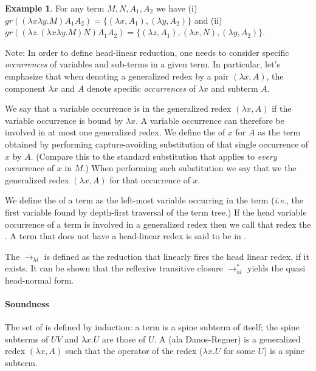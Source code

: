 \documentclass{article}
\makeatletter
\theoremstyle{definition}
\newtheorem{example}{Example}[section]
\renewcommand\ie{{\it i.e.\@\xspace}}
\makeatother
\begin{document}
\begin{example} For any term $M, N, A_1, A_2$ we have
(i) $gr((\lambda x \lambda y . M) A_1 A_2) = \{ (\lambda x, A_1), (\lambda y, A_2)\}$ and
(ii) $gr((\lambda z . (\lambda x \lambda y . M) N) A_1 A_2) = \{ (\lambda z, A_1), (\lambda x, N), (\lambda y, A_2)\}$.
\end{example}

Note: In order to define head-linear reduction, one needs to consider specific \emph{occurrences} of variables and sub-terms in a given term. In particular, let's emphasize that when denoting a generalized redex by a pair $(\lambda x, A)$, the component $\lambda x$ and $A$ denote specific \emph{occurrences} of $\lambda x$ and subterm $A$.

We say that a variable occurrence is  in the generalized redex $(\lambda x, A)$ if the variable occurrence is bound by $\lambda x$. A variable occurrence can therefore be involved in at most one generalized redex. We define the  of $x$ for $A$ as the term obtained by performing capture-avoiding substitution of that single occurrence of $x$ by $A$. (Compare this to the standard substitution that applies to \emph{every} occurrence of $x$ in $M$.) When performing such substitution we say that we  the generalized redex $(\lambda x, A)$ for that occurrence of $x$.

We define the  of a term as the left-most variable occurring in the term (\ie, the first variable found by depth-first traversal of the term tree.) If the head variable occurrence of a term is involved in a generalized redex then we call that redex the .
A term that does not have a head-linear redex is said to be in .

The  $\rightarrow_{hl}$ is defined as the reduction that linearly fires the head linear redex, if it exists. It can be shown that the reflexive transitive closure $\rightarrow^*_{hl}$ yields the quasi head-normal form.

\paragraph{Soundness}
The set of  is defined by induction: a term is a spine subterm of itself; the spine subterms of $U V$ and $\lambda x. U$ are those of $U$.
A  (ala Danos-Regner) is a generalized redex $(\lambda x, A)$ such that the operator of the redex ($\lambda x . U$ for some $U$) is a spine subterm.
\end{document}
